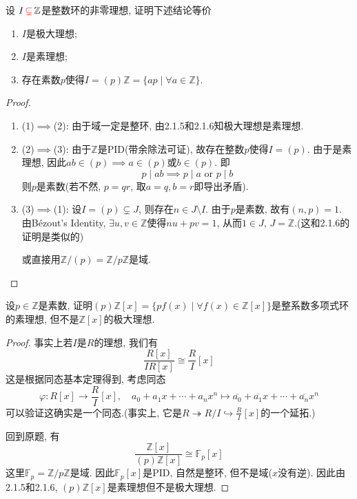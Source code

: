 \documentclass{../solutions-cn}
\begin{document}
\begin{exercise}[习题2.1.7]
    设 $I \,\textcolor{red}{\subsetneq}\, \mathbb{Z}$是整数环的非零理想, 证明下述结论等价
    \begin{enumerate}[(1)]
        \item $I$是极大理想;
        \item $I$是素理想;
        \item 存在素数$p$使得$I = (p)\mathbb{Z} = \{ap \mid \forall a \in \mathbb{Z}\}$.
    \end{enumerate}
\end{exercise}

\begin{proof}
    \begin{enumerate}[1.]
        \item (1)$\implies$(2): 由于域一定是整环, 由2.1.5和2.1.6知极大理想是素理想.
        \item (2)$\implies$(3): 由于$\mathbb{Z}$是PID(带余除法可证), 故存在整数$p$使得$I = (p)$. 由于是素理想, 因此$ab \in (p) \implies a \in (p)$或$b \in (p)$. 即
        \[
            p \mid ab \implies p \mid a \text{ or } p \mid b
        \]
        则$p$是素数(若不然, $p = qr$, 取$a = q, b = r$即导出矛盾).
        \item (3)$\implies$(1): 设$I = (p) \subsetneq J$, 则存在$n \in J \setminus I$. 由于$p$是素数, 故有$(n, p) = 1$. 由Bézout's Identity, $\exists u, v \in \mathbb{Z}$使得$nu + pv = 1$, 从而$1 \in J,\, J = \mathbb{Z}$.(这和2.1.6的证明是类似的)
        
        或直接用$\mathbb{Z}/(p) = \mathbb{Z}/p\mathbb{Z}$是域.
    \end{enumerate}
\end{proof}

\begin{exercise}[习题2.1.8]
    设$p \in \mathbb{Z}$是素数, 证明$(p)\mathbb{Z}[x] = \{pf(x) \mid \forall f(x) \in \mathbb{Z}[x]\}$是整系数多项式环的素理想, 但不是$\mathbb{Z}[x]$的极大理想.
\end{exercise}

\begin{proof}
    事实上若$I$是$R$的理想, 我们有
    \[
        \frac{R[x]}{IR[x]} \cong \frac{R}{I}[x]
    \]
    这是根据同态基本定理得到, 考虑同态
    \[
        \varphi: R[x] \to \frac{R}{I}[x],\quad a_0 + a_1x + \cdots + a_nx^n \mapsto \overline{a_0} + \overline{a_1}x + \cdots + \overline{a_n}x^n
    \]
    可以验证这确实是一个同态.(事实上, 它是$R \twoheadrightarrow R/I \hookrightarrow \frac{R}{I}[x]$的一个延拓.)

    回到原题, 有
    \[
        \frac{\mathbb{Z}[x]}{(p)\mathbb{Z}[x]} \cong \mathbb{F}_p[x]
    \]
    这里$\mathbb{F}_p = \mathbb{Z}/p\mathbb{Z}$是域. 因此$\mathbb{F}_p[x]$是PID, 自然是整环, 但不是域($x$没有逆). 因此由2.1.5和2.1.6, $(p)\mathbb{Z}[x]$是素理想但不是极大理想.
\end{proof}
\end{document}
